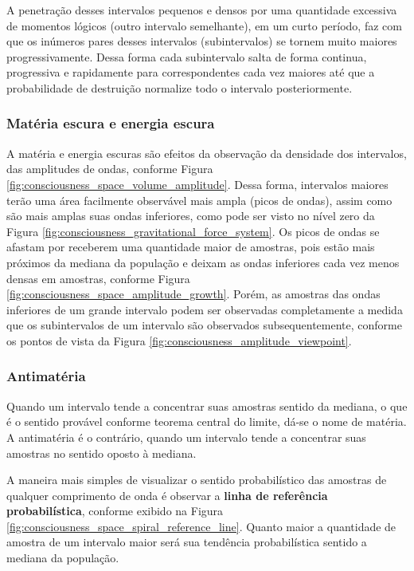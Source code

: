 A penetração desses intervalos pequenos e densos por uma quantidade excessiva de momentos lógicos (outro intervalo semelhante), em um curto período, faz com que os inúmeros pares desses intervalos (subintervalos) se tornem muito maiores progressivamente. Dessa forma cada subintervalo salta de forma continua, progressiva e rapidamente para correspondentes cada vez maiores até que a probabilidade de destruição normalize todo o intervalo posteriormente.

\subsubsection{Matéria escura e energia escura}
A matéria e energia escuras são efeitos da observação da densidade dos intervalos, das amplitudes de ondas, conforme Figura \ref{fig:consciousness_space_volume_amplitude}. Dessa forma, intervalos maiores terão uma área facilmente observável mais ampla (picos de ondas), assim como são mais amplas suas ondas inferiores, como pode ser visto no nível zero da Figura \ref{fig:consciousness_gravitational_force_system}. Os picos de ondas se afastam por receberem uma quantidade maior de amostras, pois estão mais próximos da mediana da população e deixam as ondas inferiores cada vez menos densas em amostras, conforme Figura \ref{fig:consciousness_space_amplitude_growth}. Porém, as amostras das ondas inferiores de um grande intervalo podem ser observadas completamente a medida que os subintervalos de um intervalo são observados subsequentemente, conforme os pontos de vista da Figura \ref{fig:consciousness_amplitude_viewpoint}.

\subsubsection{Antimatéria}
Quando um intervalo tende a concentrar suas amostras sentido da mediana, o que é o sentido provável conforme teorema central do limite, dá-se o nome de matéria. A antimatéria é o contrário, quando um intervalo tende a concentrar suas amostras no sentido oposto à mediana. 

A maneira mais simples de visualizar o sentido probabilístico das amostras de qualquer comprimento de onda é observar a \textbf{linha de referência probabilística}, conforme exibido na Figura \ref{fig:consciousness_space_spiral_reference_line}. Quanto maior a quantidade de amostra de um intervalo maior será sua tendência probabilística sentido a mediana da população.

